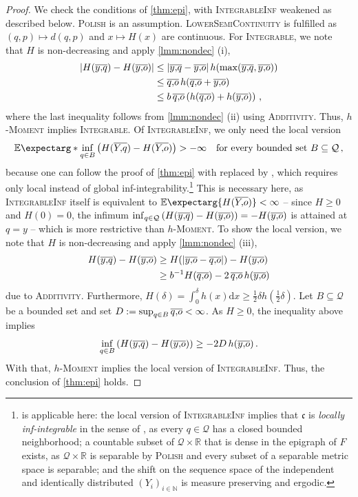 \documentclass{scrartcl}
\renewcommand{\subset}{\subseteq}
\newcommand{\Ex}{\E\expectarg}
\newcommand*{\mc}[1]{\mathcal{#1}}
\newcommand*{\mf}[1]{\mathfrak{#1}}
\newcommand{\N}{\mathbb{N}}
\newcommand{\R}{\mathbb{R}}
\newcommand{\dl}{\mathrm{d}}
\newcommand{\equationFullstop}{\, .}
\newcommand{\eqfs}{\equationFullstop}
\newcommand{\equationComma}{\, ,}
\newcommand{\eqcm}{\equationComma}
\theoremstyle{plain}\newtheorem{theorem}{Theorem}[section]
\theoremstyle{definition}
\theoremstyle{remark}
\begin{document}
\begin{proof}
	We check the conditions of \autoref{thm:epi}, with \textsc{IntegrableInf} weakened as described below. \textsc{Polish} is an assumption. 
	\textsc{LowerSemiContinuity} is fulfilled as $(q,p)\mapsto d(q,p)$ and $x \mapsto H(x)$ are continuous.
	For \textsc{Integrable}, we note that $H$ is non-decreasing and apply \autoref{lmm:nondec} (i),
	\begin{align*}
		\abs{H(\ol yq) - H(\ol yo)} 
		&\leq 
		\abs{\ol yq - \ol yo} h\brOf{\max(\ol yq, \ol yo)}
		\\&\leq 
		\ol qo\, h(\ol qo + \ol yo)
		\\&\leq 
		b\, \ol qo \br{h(\ol qo) + h(\ol yo)}
		\eqcm
	\end{align*}
	where the last inequality follows from \autoref{lmm:nondec} (ii) using \textsc{Additivity}.
	Thus, \textsc{$h$-Moment} implies \textsc{Integrable}.
	Of \textsc{IntegrableInf}, we only need the local version
	\begin{equation*}
		\Ex*{\inf_{q\in B}\br{H(\ol Yq) - H(\ol Yo)}} > -\infty
		\quad\text{for every bounded set } B\subset\mc Q
		\eqcm
	\end{equation*}
	because one can follow the proof of \autoref{thm:epi} with \cite[Theorem 1.1]{korf01} replaced by \cite[Theorem 8.2]{korf01}, which requires only local instead of global inf-integrability.\footnote{\cite[Theorem 8.2]{korf01} is applicable here: the local version of \textsc{IntegrableInf} implies that $\mf c$ is \textit{locally inf-integrable} in the sense of \cite[Definition 4.2]{korf01}, as every $q\in\mc Q$ has a closed bounded neighborhood; a countable subset of $\mc Q\times\R$ that is dense in the epigraph of $F$ exists, as $\mc Q\times\R$ is separable by \textsc{Polish} and every subset of a separable metric space is separable; and the shift on the sequence space of the independent and identically distributed $(Y_i)_{i\in\N}$ is measure preserving and ergodic.} This is necessary here, as \textsc{IntegrableInf} itself is equivalent to $\Ex{H(\ol Yo)} < \infty$ -- since $H\geq0$ and $H(0)=0$, the infimum $\inf_{q\in\mc Q}\br{H(\ol yq) - H(\ol yo)} = -H(\ol yo)$ is attained at $q=y$ -- which is more restrictive than \textsc{$h$-Moment}.
	To show the local version, we note that $H$ is non-decreasing and apply \autoref{lmm:nondec} (iii),
	\begin{align*}
		H(\ol yq) - H(\ol yo)
		&\geq 
		H(\abs{\ol yo - \ol qo}) - H(\ol yo)
		\\&\geq 
		b^{-1} H( \ol qo) - 2  \,\ol qo\, h( \ol yo)
	\end{align*}
	due to \textsc{Additivity}. Furthermore, $H(\delta)  = \int_0^\delta h(x) \dl x \geq \frac12 \delta h(\frac12 \delta)$.
	Let $B \subset \mc Q$ be a bounded set and set $D := \sup_{q\in B} \overline{q,\!o} < \infty$. As $H \geq 0$, the inequality above implies
	\begin{equation*}
		\inf_{q \in B} \br{H(\ol yq) - H(\ol yo)} \geq - 2 D\, h(\ol yo)
		\eqfs
	\end{equation*}
	With that, \textsc{$h$-Moment} implies the local version of \textsc{IntegrableInf}.
	Thus, the conclusion of \autoref{thm:epi} holds.
\end{proof}
\end{document}
